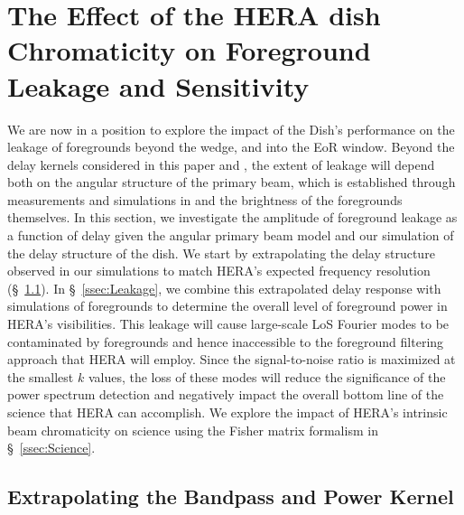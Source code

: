\documentclass[twocolumn]{emulateapj}
\begin{document}
\section{The Effect of the HERA dish Chromaticity on Foreground Leakage and Sensitivity}\label{sec:Sensitivity}
We are now in a position to explore the impact of the Dish's performance on the leakage of foregrounds beyond the wedge, and into the EoR window. Beyond the delay kernels considered in this paper and \citep{Patra:2016}, the extent of leakage will depend both on the angular structure of the primary beam, which is established through measurements and simulations in \citep{Neben:2016} and the brightness of the foregrounds themselves. In this section, we investigate the amplitude of foreground leakage as a function of delay given the angular primary beam model and our simulation of the delay structure of the dish. We start by extrapolating the delay structure observed in our simulations to match HERA's expected frequency resolution (\S~\ref{ssec:Extrapolation}). In \S~\ref{ssec:Leakage}, we combine this extrapolated delay response with simulations of foregrounds to determine the overall level of foreground power in HERA's visibilities. This leakage will cause large-scale LoS Fourier modes to be contaminated by foregrounds and hence inaccessible to the foreground filtering approach that HERA will employ. Since the signal-to-noise ratio is maximized at the smallest $k$ values, the loss of these modes will reduce the significance of the power spectrum detection and negatively impact the overall bottom line of the science that HERA can accomplish. We explore the impact of HERA's intrinsic beam chromaticity on science using the Fisher matrix formalism in \S~\ref{ssec:Science}. 


\subsection{Extrapolating the Bandpass and Power Kernel}\label{ssec:Extrapolation}
\end{document}

